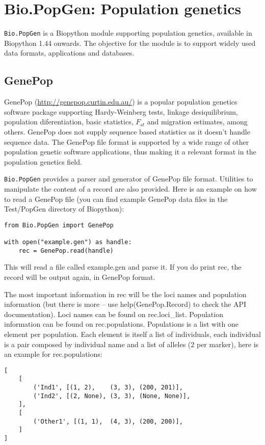 \chapter{Bio.PopGen: Population genetics}
\label{chapter:popgen}

\verb|Bio.PopGen| is a Biopython module supporting population genetics,
available in Biopython 1.44 onwards. The objective for the module is to
support widely used data formats, applications and databases.

\section{GenePop}

GenePop (\url{http://genepop.curtin.edu.au/}) is a popular population
genetics software package supporting Hardy-Weinberg tests, linkage
desiquilibrium, population diferentiation, basic statistics, $F_{st}$ and
migration estimates, among others. GenePop does not supply sequence
based statistics as it doesn't handle sequence data.
The GenePop file format is supported by a wide range of other population
genetic software applications, thus making it a relevant format in the
population genetics field.

\verb|Bio.PopGen| provides a parser and generator of GenePop file format.
Utilities to manipulate the content of a record are also provided.
Here is an example on how to read a GenePop file (you can find
example GenePop data files in the Test/PopGen directory of Biopython):

\begin{verbatim}
from Bio.PopGen import GenePop

with open("example.gen") as handle:
    rec = GenePop.read(handle)
\end{verbatim}

This will read a file called example.gen and parse it. If you
do print rec, the record will be output again, in GenePop format.

The most important information in rec will be the loci names and
population information (but there is more -- use help(GenePop.Record)
to check the API documentation). Loci names can be found on rec.loci\_list.
Population information can be found on rec.populations.
Populations is a list with one element per population. Each element is itself
a list of individuals, each individual is a pair composed by individual
name and a list of alleles (2 per marker), here is an example for
rec.populations:

\begin{verbatim}
[
    [
        ('Ind1', [(1, 2),    (3, 3), (200, 201)],
        ('Ind2', [(2, None), (3, 3), (None, None)],
    ],
    [
        ('Other1', [(1, 1),  (4, 3), (200, 200)],
    ]
]
\end{verbatim}

